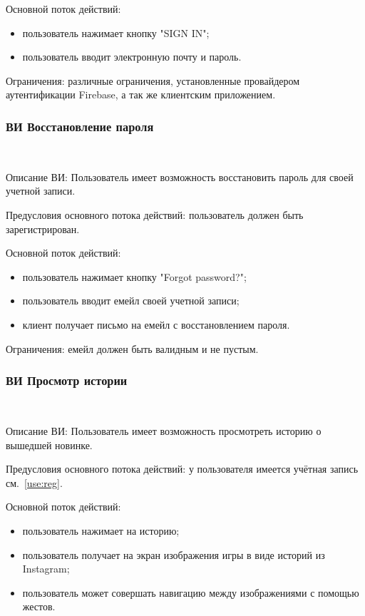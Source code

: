 Основной поток действий:
\begin{itemize}
   \item пользователь нажимает кнопку "SIGN IN";
   \item пользователь вводит электронную почту и пароль.
\end{itemize}
 
Ограничения: различные ограничения, установленные провайдером аутентификации Firebase, а так же клиентским приложением.

\subsubsection{ВИ Восстановление пароля}~\par
\label{use:resetpassword}
Описание ВИ: Пользователь имеет возможность восстановить пароль для своей учетной записи.
 
Предусловия основного потока действий: пользователь должен быть зарегистрирован.
 
Основной поток действий:
\begin{itemize}
   \item пользователь нажимает кнопку "Forgot password?";
   \item пользователь вводит емейл своей учетной записи;
   \item клиент получает письмо на емейл с восстановлением пароля.
\end{itemize}
 
Ограничения: емейл должен быть валидным и не пустым.
 
\subsubsection{ВИ Просмотр истории}~\par
Описание ВИ: Пользователь имеет возможность просмотреть историю о вышедшей новинке.
 
Предусловия основного потока действий: у пользователя имеется учётная запись см.~\ref{use:reg}.
 
Основной поток действий:
\begin{itemize}
   \item пользователь нажимает на историю;
   \item пользователь получает на экран изображения игры в виде историй из Instagram;
   \item пользователь может совершать навигацию между изображениями с помощью жестов.
\end{itemize}
 
